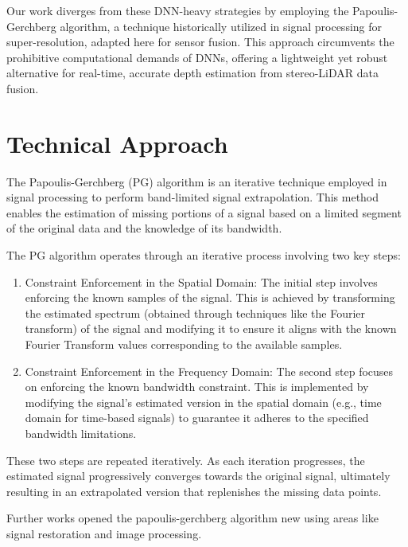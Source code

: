 \documentclass[conference]{IEEEtran}
\begin{document}
Our work diverges from these DNN-heavy strategies by employing the Papoulis-Gerchberg algorithm, a technique historically utilized in signal processing for super-resolution, adapted here for sensor fusion. This approach circumvents the prohibitive computational demands of DNNs, offering a lightweight yet robust alternative for real-time, accurate depth estimation from stereo-LiDAR data fusion.

\section{Technical Approach}

The Papoulis-Gerchberg (PG) algorithm is an iterative technique employed in signal processing to perform band-limited signal extrapolation. This method enables the estimation of missing portions of a signal based on a limited segment of the original data and the knowledge of its bandwidth.

The PG algorithm operates through an iterative process involving two key steps:

\begin{enumerate}
    \item Constraint Enforcement in the Spatial Domain:
    The initial step involves enforcing the known samples of the signal. This is achieved by transforming the estimated spectrum (obtained through techniques like the Fourier transform) of the signal and modifying it to ensure it aligns with the known Fourier Transform values corresponding to the available samples.
    
    \item Constraint Enforcement in the Frequency Domain:
    The second step focuses on enforcing the known bandwidth constraint. This is implemented by modifying the signal's estimated version in the spatial domain (e.g., time domain for time-based signals) to guarantee it adheres to the specified bandwidth limitations.
\end{enumerate}

These two steps are repeated iteratively. As each iteration progresses, the estimated signal progressively converges towards the original signal, ultimately resulting in an extrapolated version that replenishes the missing data points.

Further works opened the papoulis-gerchberg algorithm new using areas like signal restoration and image processing.
\end{document}
